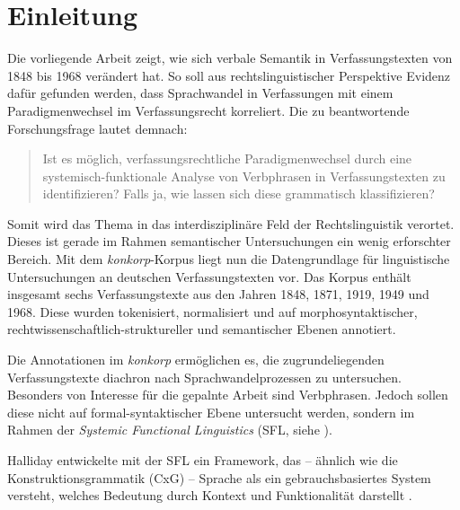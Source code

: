 \section{Einleitung}\label{sec:1}

Die vorliegende Arbeit zeigt, wie sich verbale Semantik in Verfassungstexten von 1848 bis 1968 verändert hat. So soll aus rechtslinguistischer Perspektive Evidenz dafür gefunden werden, dass Sprachwandel in Verfassungen mit einem Paradigmenwechsel im Verfassungsrecht korreliert. Die zu beantwortende Forschungsfrage lautet demnach:

\begin{quote}
Ist es möglich, verfassungsrechtliche Paradigmenwechsel durch eine systemisch-funktionale Analyse von Verbphrasen in Verfassungstexten zu identifizieren? Falls ja, wie lassen sich diese grammatisch klassifizieren?
\end{quote}


Somit wird das Thema in das interdisziplinäre Feld der Rechtslinguistik verortet. Dieses ist gerade im Rahmen semantischer Untersuchungen ein wenig erforschter Bereich. Mit dem \textit{konkorp}-Korpus \citep{Thurau2025} liegt nun die Datengrundlage für linguistische Untersuchungen an deutschen Verfassungstexten vor. Das Korpus enthält insgesamt sechs Verfassungstexte aus den Jahren 1848, 1871, 1919, 1949 und 1968. Diese wurden tokenisiert, normalisiert und auf morphosyntaktischer, rechtwissenschaftlich-struktureller und semantischer Ebenen annotiert.

Die Annotationen im \textit{konkorp} ermöglichen es, die zugrundeliegenden Verfassungstexte diachron nach Sprachwandelprozessen zu untersuchen. Besonders von Interesse für die gepalnte Arbeit sind Verbphrasen. Jedoch sollen diese nicht auf formal-syntaktischer Ebene untersucht werden, sondern im Rahmen der \textit{Systemic Functional Linguistics} (SFL, siehe \citealt{Halliday1978,Halliday2004}).

Halliday entwickelte mit der SFL ein Framework, das -- ähnlich wie die Konstruktionsgrammatik (CxG) -- Sprache als ein gebrauchsbasiertes System versteht, welches Bedeutung durch Kontext und Funktionalität darstellt \citep{FillmoreKay1995}.

